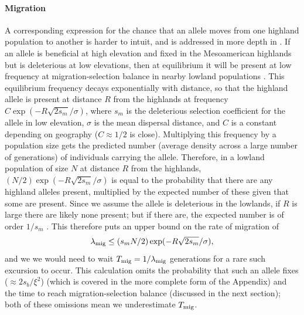\paragraph{Migration}
A corresponding expression for the chance that an allele moves from one highland population to another is harder to intuit, and is addressed in more depth in \cite{ralph2014convergent}.
If an allele is beneficial at high elevation and fixed in the Mesoamerican highlands but is deleterious at low elevations, then at equilibrium it will be present at low frequency at migration-selection balance in nearby lowland populations \citep{haldane1948theory,slatkin1973geneflow}.
This equilibrium frequency decays exponentially with distance, so that the highland allele is present at distance $R$ from the highlands at frequency $C \exp(- R \sqrt{2s_m} / \sigma)$, where $s_m$ is the deleterious selection coefficient for the allele in low elevation, $\sigma$ is the mean dispersal distance, and $C$ is a constant depending on geography ($C\approx 1/2$ is close).
Multiplying this frequency by a population size gets the predicted number (average density across a large number of generations) of individuals carrying the allele.
Therefore, in a lowland population of size $N$ at distance $R$ from the highlands, $(N/2)  \exp(- R \sqrt{2s_m} / \sigma)$ 
is equal to the probability that there are any highland alleles present, multiplied by the expected number of these given that some are present.
Since we assume the allele is deleterious in the lowlands, if $R$ is large there are likely none present;
but if there are, the expected number is of order $1/s_m$ \citep{geiger1999elementary,ralph2014convergent}.
This therefore puts an upper bound on the rate of migration of
\begin{align} \label{eqn:migrate}
  \lambda_{\text{mig}} \le (s_m N/2)  \exp(- R \sqrt{2s_m} / \sigma),
\end{align}
and we we would need to wait $T_{\text{mig}} = 1/\lambda_{\text{mig}}$ generations for a rare such excursion to occur.
This calculation omits the probability that such an allele fixes ($\approx 2s_b/\xi^2$)
(which is covered in the more complete form of the Appendix)
and the time to reach migration-selection balance
(discussed in the next section);
both of these omissions mean we underestimate $T_{\text{mig}}$.

